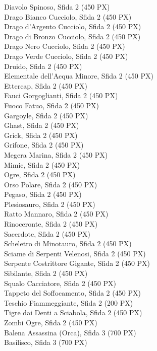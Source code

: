 \begin{multicols}{3}
{Diavolo Spinoso, Sfida 2 (450 PX)\\
Drago Bianco Cucciolo, Sfida 2 (450 PX)\\
Drago d'Argento Cucciolo, Sfida 2 (450 PX)\\
Drago di Bronzo Cucciolo, Sfida 2 (450 PX)\\
Drago Nero Cucciolo, Sfida 2 (450 PX)\\
Drago Verde Cucciolo, Sfida 2 (450 PX)\\
Druido, Sfida 2 (450 PX)\\
Elementale dell'Acqua Minore, Sfida 2 (450 PX)\\
Ettercap, Sfida 2 (450 PX)\\
Fauci Gorgoglianti, Sfida 2 (450 PX)\\
Fuoco Fatuo, Sfida 2 (450 PX)\\
Gargoyle, Sfida 2 (450 PX)\\
Ghast, Sfida 2 (450 PX)\\
Grick, Sfida 2 (450 PX)\\
Grifone, Sfida 2 (450 PX)\\
Megera Marina, Sfida 2 (450 PX)\\
Mimic, Sfida 2 (450 PX)\\
Ogre, Sfida 2 (450 PX)\\
Orso Polare, Sfida 2 (450 PX)\\
Pegaso, Sfida 2 (450 PX)\\
Plesiosauro, Sfida 2 (450 PX)\\
Ratto Mannaro, Sfida 2 (450 PX)\\
Rinoceronte, Sfida 2 (450 PX)\\
Sacerdote, Sfida 2 (450 PX)\\
Scheletro di Minotauro, Sfida 2 (450 PX)\\
Sciame di Serpenti Velenosi, Sfida 2 (450 PX)\\
Serpente Costrittore Gigante, Sfida 2 (450 PX)\\
Sibilante, Sfida 2 (450 PX)\\
Squalo Cacciatore, Sfida 2 (450 PX)\\
Tappeto del Soffocamento, Sfida 2 (450 PX)\\
Teschio Fiammeggiante, Sfida 2 (200 PX)\\
Tigre dai Denti a Sciabola, Sfida 2 (450 PX)\\
Zombi Ogre, Sfida 2 (450 PX)\\
Balena Assassina (Orca), Sfida 3 (700 PX)\\
Basilisco, Sfida 3 (700 PX)\\
}
\end{multicols}
